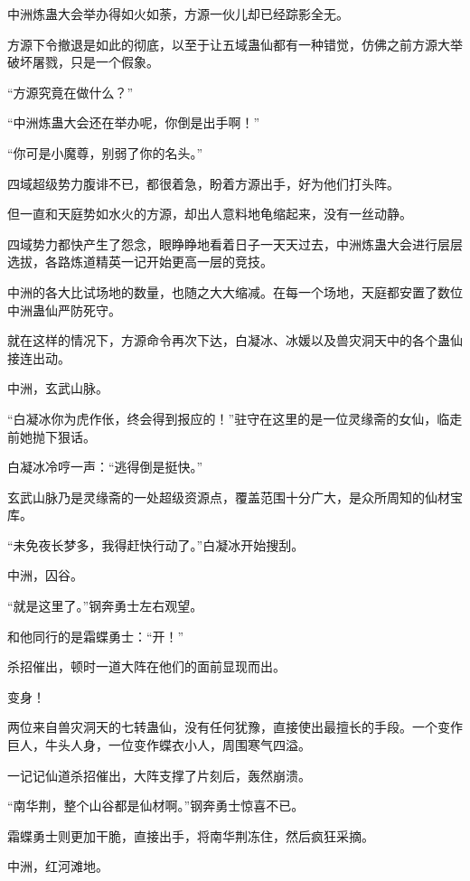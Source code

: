 
\begin{this_body}

中洲炼蛊大会举办得如火如荼，方源一伙儿却已经踪影全无。

方源下令撤退是如此的彻底，以至于让五域蛊仙都有一种错觉，仿佛之前方源大举破坏屠戮，只是一个假象。

“方源究竟在做什么？”

“中洲炼蛊大会还在举办呢，你倒是出手啊！”

“你可是小魔尊，别弱了你的名头。”

四域超级势力腹诽不已，都很着急，盼着方源出手，好为他们打头阵。

但一直和天庭势如水火的方源，却出人意料地龟缩起来，没有一丝动静。

四域势力都快产生了怨念，眼睁睁地看着日子一天天过去，中洲炼蛊大会进行层层选拔，各路炼道精英一记开始更高一层的竞技。

中洲的各大比试场地的数量，也随之大大缩减。在每一个场地，天庭都安置了数位中洲蛊仙严防死守。

就在这样的情况下，方源命令再次下达，白凝冰、冰媛以及兽灾洞天中的各个蛊仙接连出动。

中洲，玄武山脉。

“白凝冰你为虎作伥，终会得到报应的！”驻守在这里的是一位灵缘斋的女仙，临走前她抛下狠话。

白凝冰冷哼一声：“逃得倒是挺快。”

玄武山脉乃是灵缘斋的一处超级资源点，覆盖范围十分广大，是众所周知的仙材宝库。

“未免夜长梦多，我得赶快行动了。”白凝冰开始搜刮。

中洲，囚谷。

“就是这里了。”钢奔勇士左右观望。

和他同行的是霜蝶勇士：“开！”

杀招催出，顿时一道大阵在他们的面前显现而出。

变身！

两位来自兽灾洞天的七转蛊仙，没有任何犹豫，直接使出最擅长的手段。一个变作巨人，牛头人身，一位变作蝶衣小人，周围寒气四溢。

一记记仙道杀招催出，大阵支撑了片刻后，轰然崩溃。

“南华荆，整个山谷都是仙材啊。”钢奔勇士惊喜不已。

霜蝶勇士则更加干脆，直接出手，将南华荆冻住，然后疯狂采摘。

中洲，红河滩地。


\end{this_body}
